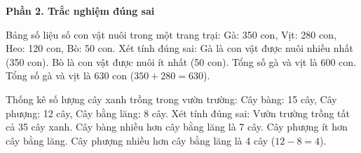 \textbf{Phần 2. Trắc nghiệm đúng sai}

\begin{ex} %
Bảng số liệu số con vật nuôi trong một trang trại: Gà: 350 con, Vịt: 280 con, Heo: 120 con, Bò: 50 con. Xét tính đúng sai:
\choiceTF
{\True Gà là con vật được nuôi nhiều nhất (350 con).}
{\True Bò là con vật được nuôi ít nhất (50 con).}
{Tổng số gà và vịt là 600 con.}
{\True Tổng số gà và vịt là 630 con ($350 + 280 = 630$).}
\end{ex}

\begin{ex} %
Thống kê số lượng cây xanh trồng trong vườn trường: Cây bàng: 15 cây, Cây phượng: 12 cây, Cây bằng lăng: 8 cây. Xét tính đúng sai:
\choiceTF
{\True Vườn trường trồng tất cả 35 cây xanh.}
{\True Cây bàng nhiều hơn cây bằng lăng là 7 cây.}
{Cây phượng ít hơn cây bằng lăng.}
{\True Cây phượng nhiều hơn cây bằng lăng là 4 cây ($12 - 8 = 4$).}
\end{ex}


